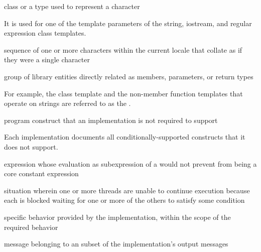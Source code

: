 %
class or a type used to
represent a character

\begin{defnote}
It is used for one of the template parameters of the string,
iostream, and regular expression class templates.
\end{defnote}

%
sequence of one or more characters within the
current locale that collate as if they were a single character

%
group of library entities directly related as members, parameters, or
return types

\begin{defnote}
For example, the class template
and the non-member
function templates
that operate on
strings are referred to as the
.
\end{defnote}

%
program construct that an implementation is not required to support

\begin{defnote}
Each implementation documents all conditionally-supported
constructs that it does not support.
\end{defnote}

%
expression whose evaluation as subexpression of a
 would not prevent 
from being a core constant expression

%
situation wherein
one or more threads are unable to continue execution because each is
blocked waiting for one or more of the others to satisfy some condition

%
specific behavior provided by the implementation,
within the scope of the required behavior

%
message belonging to an  subset of the
implementation's output messages

